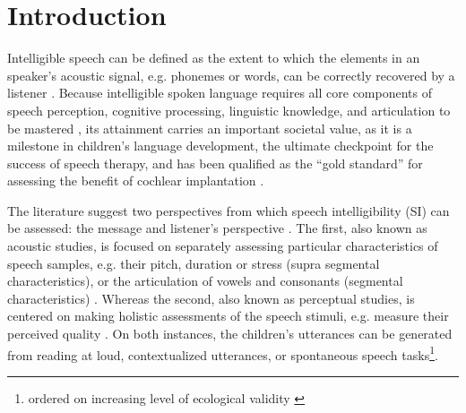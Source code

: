 \section{Introduction}

Intelligible speech can be defined as the extent to which the elements in an speaker's acoustic signal, e.g. phonemes or words, can be correctly recovered by a listener \citep{Kent_et_al_1989, Whitehill_et_al_2004, vanHeuven_2008, Freeman_et_al_2017}. Because intelligible spoken language requires all core components of speech perception, cognitive processing, linguistic knowledge, and articulation to be mastered \citep{Freeman_et_al_2017}, its attainment carries an important societal value, as it is a milestone in children's language development, the ultimate checkpoint for the success of speech therapy, and has been qualified as the ``gold standard'' for assessing the benefit of cochlear implantation \citep{Chin_et_al_2012}. 

The literature suggest two perspectives from which speech intelligibility (SI) can be assessed: the message and listener's perspective \citep{Boonen_et_al_2020, Boonen_et_al_2021}. The first, also known as acoustic studies, is focused on separately assessing particular characteristics of speech samples, e.g. their pitch, duration or stress (supra segmental characteristics), or the articulation of vowels and consonants (segmental characteristics) \citep{Rowe_et_al_2018}. Whereas the second, also known as perceptual studies, is centered on making holistic assessments of the speech stimuli, e.g. measure their perceived quality \citep{Boonen_et_al_2020, Boonen_et_al_2021}. On both instances, the children's utterances can be generated from reading at loud, contextualized utterances, or spontaneous speech tasks\footnote{ordered on increasing level of ecological validity \citep{Flipsen_2006,Ertmer_2011}}.

\begin{comment}
Based on their description, it seems that perceptual are more subjective than acoustic studies, as they do not rely on "objective" measurements, i.e. time duration, wave amplitude, among others, available in the former. However, for the case of SI, there are objective and subjective assessment methodologies.
\end{comment}

